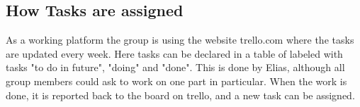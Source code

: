 \subsection {How Tasks are assigned}
As a working platform the group is using the website trello.com where the tasks are updated every week. Here tasks can be declared in a table of labeled with tasks "to do in future", "doing" and "done". This is done by Elias, although all group members could ask to work on one part in particular. When the work is done, it is reported back to the board on trello, and a new task can be assigned.  
